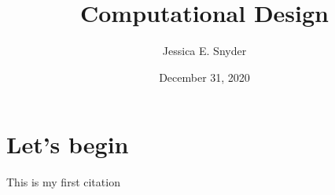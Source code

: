 \documentclass[a4paper,11pt]{article}
\begin{document}
\title{Computational Design}
\author{Jessica E. Snyder}
\date{December 31, 2020}
\maketitle

\begin{abstract}

\tableofcontents
\newpage

\end{abstract}

\section{Let's begin}
This is my first citation \cite{arafah2019maldi}





\end{document}
